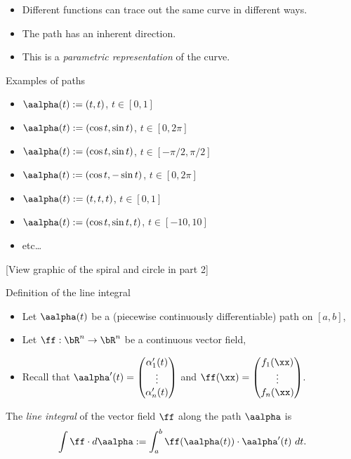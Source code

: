     \begin{itemize}
        \item     Different functions can trace out the same curve in different ways.
        \item     The path has an inherent direction.
        \item     This is a \emph{parametric representation} of the curve.
    \end{itemize}




    {Examples of paths}

    \begin{itemize}
        \item \(\aalpha(t):= (t,t)\), \(t\in[0,1]\)
        \item \(\aalpha(t) := (\cos t, \sin t)\), \(t\in[0,2\pi]\)
        \item \(\aalpha(t) := (\cos t, \sin t)\), \(t\in [-\pi/2,\pi/2]\)
        \item \(\aalpha(t) := (\cos t, -\sin t)\), \(t\in[0,2\pi]\)
        \item \(\aalpha(t):= (t,t,t)\), \(t\in[0,1]\)
        \item \(\aalpha(t):=(\cos t, \sin t, t)\), \(t\in [-10,10]\)
        \item etc\ldots
    \end{itemize}

    [View graphic of the spiral and circle in part 2]




    {Definition of the line integral}

    \begin{itemize}
        \item Let \(\aalpha(t)\) be a (piecewise continuously differentiable) path on \([a,b]\),
        \item Let \(\ff: \bR^n\to\bR^n\) be a continuous vector field,
        \item Recall that \(\aalpha'(t) = \begin{pmatrix}
                  \alpha_1'(t) \\ \vdots \\ \alpha_n'(t)
              \end{pmatrix}\)
              and \(\ff(\xx) = \begin{pmatrix}
                  f_1(\xx) \\ \vdots \\ f_n(\xx)
              \end{pmatrix}\).
    \end{itemize}
    \begin{definition}
        The \emph{line integral} of the vector field \(\ff\) along the path \(\aalpha\) is
        \[
            \int \ff \cdot d\aalpha := \int_{a}^{b} \ff(\aalpha(t)) \cdot \aalpha'(t) \ dt.
        \]
    \end{definition}

